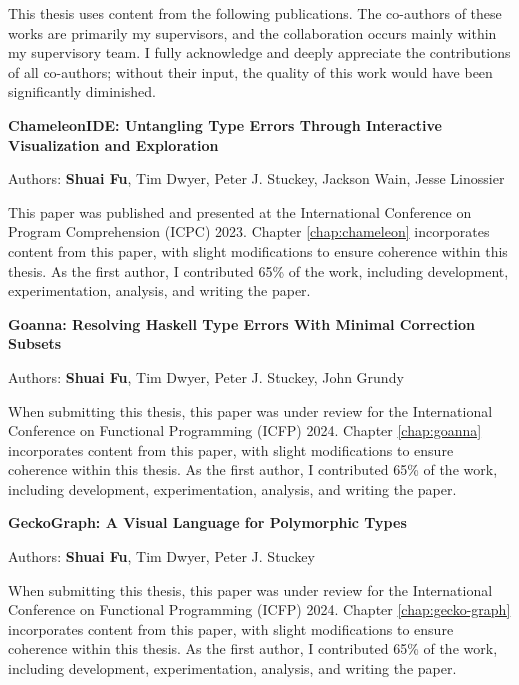 \documentclass[
11pt, %
english, %
singlespacing, %
headsepline, %
]{MastersDoctoralThesis} %
\begin{document}
\begin{publications}

This thesis uses content from the following publications. The co-authors of these works are primarily my supervisors, and the collaboration occurs mainly within my supervisory team. I fully acknowledge and deeply appreciate the contributions of all co-authors; without their input, the quality of this work would have been significantly diminished.

\vspace{20px}

\noindent
\textbf{ChameleonIDE: Untangling Type Errors Through Interactive
  Visualization and Exploration}

\noindent
Authors: \textbf{Shuai Fu}, Tim Dwyer, Peter J. Stuckey, Jackson Wain, Jesse Linossier
\vspace{10px}

This paper was published and presented at the International Conference on Program Comprehension (ICPC) 2023. Chapter \ref{chap:chameleon} incorporates content from this paper, with slight modifications to ensure coherence within this thesis. As the first author, I contributed 65\% of the work, including development, experimentation, analysis, and writing the paper.
 

\vspace{30px}

\noindent
\textbf{Goanna: Resolving Haskell Type Errors With Minimal Correction Subsets}

\noindent
Authors: \textbf{Shuai Fu}, Tim Dwyer, Peter J. Stuckey, John Grundy
\vspace{10px}

When submitting this thesis, this paper was under review for the International Conference on Functional Programming (ICFP) 2024. Chapter \ref{chap:goanna} incorporates content from this paper, with slight modifications to ensure coherence within this thesis. As the first author, I contributed 65\% of the work, including development, experimentation, analysis, and writing the paper.



\vspace{30px}


\noindent
\textbf{GeckoGraph: A Visual Language for Polymorphic Types}

\noindent
Authors: \textbf{Shuai Fu}, Tim Dwyer, Peter J. Stuckey
\vspace{10px}

When submitting this thesis, this paper was under review for the International Conference on Functional Programming (ICFP) 2024. Chapter \ref{chap:gecko-graph} incorporates content from this paper, with slight modifications to ensure coherence within this thesis. As the first author, I contributed 65\% of the work, including development, experimentation, analysis, and writing the paper.

\end{publications}
\end{document}

